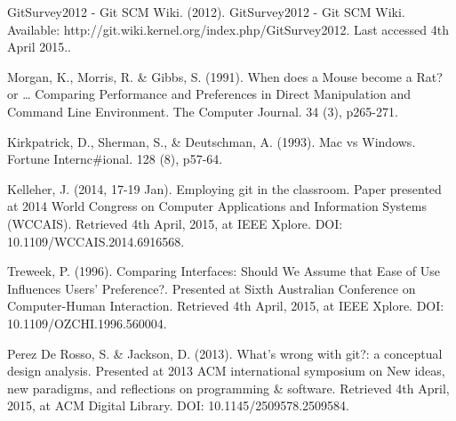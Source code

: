 \documentclass[12pt,a4paper,article,compsoc]{IEEEtran}
\begin{document}
		\newpage
		\begin{thebibliography}{1}
			
			GitSurvey2012 - Git SCM Wiki. (2012). GitSurvey2012 - Git SCM Wiki. Available: http://git.wiki.kernel.org/index.php/GitSurvey2012. Last accessed 4th April 2015..
			
			Morgan, K., Morris, R. \& Gibbs, S. (1991). When does a Mouse become a Rat? or … Comparing Performance and Preferences in Direct Manipulation and Command Line Environment. The Computer Journal. 34 (3), p265-271.
			
			Kirkpatrick, D., Sherman, S., \& Deutschman, A. (1993). Mac vs Windows. Fortune Internc\#ional. 128 (8), p57-64.
			
			Kelleher, J. (2014, 17-19 Jan). Employing git in the classroom. Paper presented at 2014 World Congress on Computer Applications and Information Systems (WCCAIS). Retrieved 4th April, 2015, at IEEE Xplore. DOI: 10.1109/WCCAIS.2014.6916568.
			
			Treweek, P. (1996). Comparing Interfaces: Should We Assume that Ease of Use Influences Users' Preference?. Presented at Sixth Australian Conference on Computer-Human Interaction. Retrieved 4th April, 2015, at IEEE Xplore. DOI: 10.1109/OZCHI.1996.560004.
			
			
			Perez De Rosso, S. \& Jackson, D. (2013). What's wrong with git?: a conceptual design analysis. Presented at 2013 ACM international symposium on New ideas, new paradigms, and reflections on programming \& software. Retrieved 4th April, 2015, at ACM Digital Library. DOI: 10.1145/2509578.2509584.
			
		\end{thebibliography}
\end{document}
